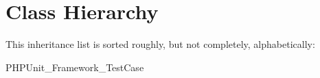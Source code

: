 \section{Class Hierarchy}
This inheritance list is sorted roughly, but not completely, alphabetically\-:\begin{DoxyCompactList}
\item P\-H\-P\-Unit\-\_\-\-Framework\-\_\-\-Test\-Case\begin{DoxyCompactList}
\item {}
\item {}
\item {}
\end{DoxyCompactList}
\end{DoxyCompactList}
